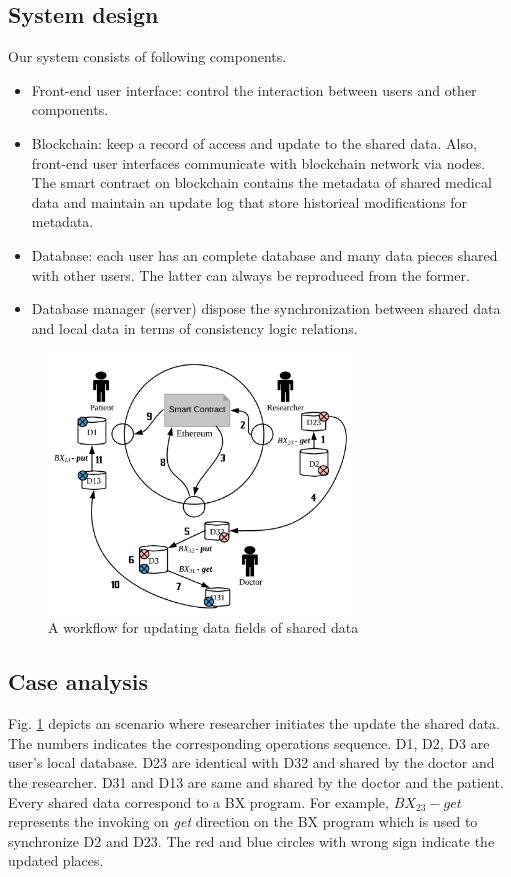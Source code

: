 \documentclass[conference]{IEEEtran}
\begin{document}
\subsection{System design}
Our system consists of following components. %
\begin{itemize}
	\item Front-end user interface: control the interaction between users and other components.
	
	\item Blockchain: keep a record of access and update to the shared data. Also, front-end user interfaces communicate with blockchain network via nodes. The smart contract on blockchain contains the metadata of shared medical data and maintain an update log that store historical modifications for metadata.
	
	\item Database: each user has an complete database and many data pieces shared with other users. The latter can always be reproduced from the former.
	
	\item Database manager (server) dispose the synchronization between shared data and local data in terms of consistency logic relations.

\end{itemize}

\begin{figure}[htbp]
	\centerline{\includegraphics[width=230pt]{updateScenario.png}}
	\caption{A workflow for updating data fields of shared data}
	\label{workflow}
\end{figure}

\subsection{Case analysis}
Fig. \ref{workflow} depicts an scenario where researcher initiates the update the shared data. The numbers indicates the corresponding operations sequence. D1, D2, D3 are user's local database. D23 are identical with D32 and shared by the doctor and the researcher. D31 and D13 are same and shared by the doctor and the patient. Every shared data correspond to a BX program. For example, $BX_{23}-get$ represents the invoking on \textit{get} direction on the BX program which is used to synchronize D2 and D23. The red and blue circles with wrong sign indicate the updated places.
\end{document}
